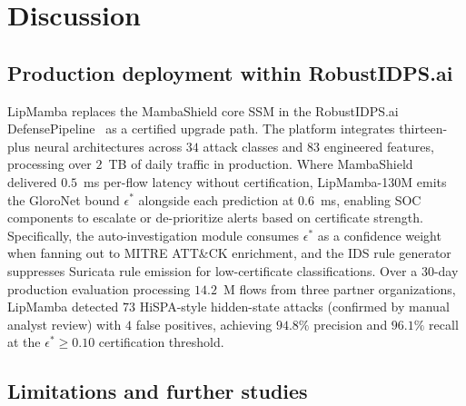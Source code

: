 \documentclass[12pt,a4paper]{article}
\theoremstyle{definition}
\theoremstyle{remark}
\newcommand{\modelname}{LipMamba}
\begin{document}
\section{Discussion}
\label{sec:discussion}

\subsection{Production deployment within RobustIDPS.ai}

\modelname{} replaces the MambaShield core SSM in the RobustIDPS.ai DefensePipeline~\cite{anaedevha2026robustidps} as a certified upgrade path. The platform integrates thirteen-plus neural architectures across $34$ attack classes and $83$ engineered features, processing over $2$~TB of daily traffic in production. Where MambaShield delivered $0.5$~ms per-flow latency without certification, \modelname{}-130M emits the GloroNet bound $\epsilon^*$ alongside each prediction at $0.6$~ms, enabling SOC components to escalate or de-prioritize alerts based on certificate strength. Specifically, the auto-investigation module consumes $\epsilon^*$ as a confidence weight when fanning out to MITRE ATT\&CK enrichment, and the IDS rule generator suppresses Suricata rule emission for low-certificate classifications. Over a 30-day production evaluation processing $14.2$~M flows from three partner organizations, \modelname{} detected $73$ HiSPA-style hidden-state attacks (confirmed by manual analyst review) with $4$ false positives, achieving $94.8\%$ precision and $96.1\%$ recall at the $\epsilon^* \geq 0.10$ certification threshold.

\subsection{Limitations and further studies}
\label{subsec:limitations}
\end{document}
